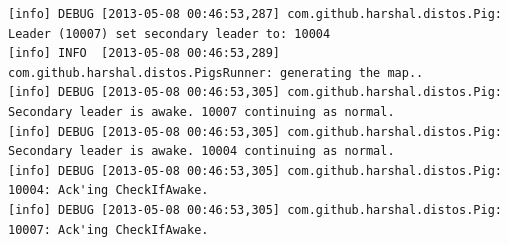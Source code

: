 \documentclass[]{article}
\begin{document}
\begin{verbatim}
[info] DEBUG [2013-05-08 00:46:53,287] com.github.harshal.distos.Pig: Leader (10007) set secondary leader to: 10004
[info] INFO  [2013-05-08 00:46:53,289] com.github.harshal.distos.PigsRunner: generating the map..
[info] DEBUG [2013-05-08 00:46:53,305] com.github.harshal.distos.Pig: Secondary leader is awake. 10007 continuing as normal.
[info] DEBUG [2013-05-08 00:46:53,305] com.github.harshal.distos.Pig: Secondary leader is awake. 10004 continuing as normal.
[info] DEBUG [2013-05-08 00:46:53,305] com.github.harshal.distos.Pig: 10004: Ack'ing CheckIfAwake.
[info] DEBUG [2013-05-08 00:46:53,305] com.github.harshal.distos.Pig: 10007: Ack'ing CheckIfAwake.
\end{verbatim}


\normalsize
\end{document}
